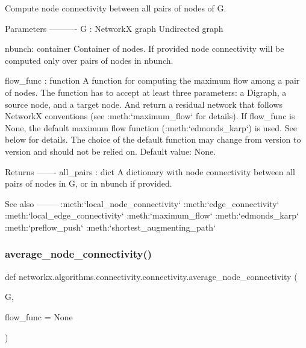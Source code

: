 \begin{DoxyVerb}Compute node connectivity between all pairs of nodes of G.

Parameters
----------
G : NetworkX graph
    Undirected graph

nbunch: container
    Container of nodes. If provided node connectivity will be computed
    only over pairs of nodes in nbunch.

flow_func : function
    A function for computing the maximum flow among a pair of nodes.
    The function has to accept at least three parameters: a Digraph,
    a source node, and a target node. And return a residual network
    that follows NetworkX conventions (see :meth:`maximum_flow` for
    details). If flow_func is None, the default maximum flow function
    (:meth:`edmonds_karp`) is used. See below for details. The
    choice of the default function may change from version
    to version and should not be relied on. Default value: None.

Returns
-------
all_pairs : dict
    A dictionary with node connectivity between all pairs of nodes
    in G, or in nbunch if provided.

See also
--------
:meth:`local_node_connectivity`
:meth:`edge_connectivity`
:meth:`local_edge_connectivity`
:meth:`maximum_flow`
:meth:`edmonds_karp`
:meth:`preflow_push`
:meth:`shortest_augmenting_path`\end{DoxyVerb}
 \mbox{\label{namespacenetworkx_1_1algorithms_1_1connectivity_1_1connectivity_a9ca77b87901f9285042c33892b563dd3}} 
\subsubsection{\texorpdfstring{average\+\_\+node\+\_\+connectivity()}{average\_node\_connectivity()}}
{\footnotesize\ttfamily def networkx.\+algorithms.\+connectivity.\+connectivity.\+average\+\_\+node\+\_\+connectivity (\begin{DoxyParamCaption}\item[{}]{G,  }\item[{}]{flow\+\_\+func = {\ttfamily None} }\end{DoxyParamCaption})}

